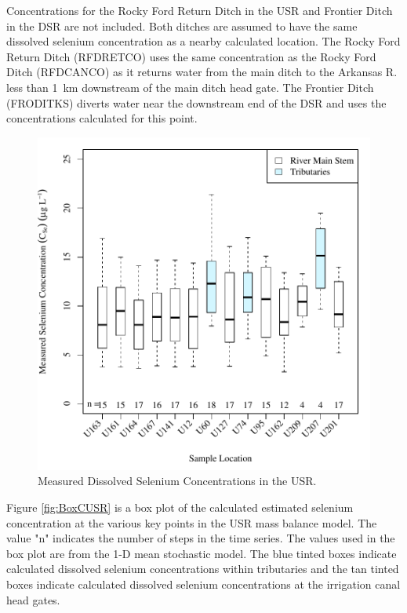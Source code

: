 Concentrations for the Rocky Ford Return Ditch in the USR and Frontier Ditch in the DSR are not included.  Both ditches are assumed to have the same dissolved selenium concentration as a nearby calculated location.  The Rocky Ford Return Ditch (RFDRETCO) uses the same concentration as the Rocky Ford Ditch (RFDCANCO) as it returns water from the main ditch to the Arkansas R. less than \SI{1}{\kilo\meter} downstream of the main ditch head gate.  The Frontier Ditch (FRODITKS) diverts water near the downstream end of the DSR and uses the concentrations calculated for this point.

\begin{figure}[htbp]
\centering
	\includegraphics[width=6in]{"Figures/Results_USR/Stochastic/c BOX Measure CSe"}
	\caption[Measured Dissolved Selenium Concentrations in the USR.]{Measured Dissolved Selenium Concentrations in the USR.}
	\label{fig:BoxMUSR}
\end{figure}

Figure \ref{fig:BoxCUSR} is a box plot of the calculated estimated selenium concentration at the various key points in the USR mass balance model.  The value "n" indicates the number of steps in the time series.  The values used in the box plot are from the 1-D mean stochastic model.  The blue tinted boxes indicate calculated dissolved selenium concentrations within tributaries and the tan tinted boxes indicate calculated dissolved selenium concentrations at the irrigation canal head gates.

